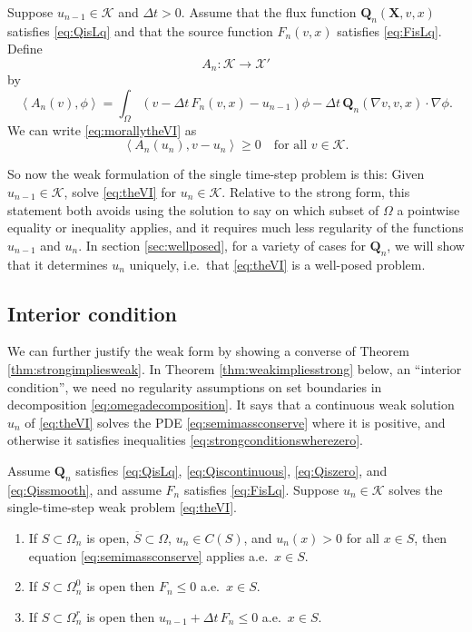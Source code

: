 \documentclass[final,leqno,onefignum,onetabnum]{siamltex1213bueler}
\newcommand\bQ{\mathbf{Q}}
\newcommand\bX{\mathbf{X}}
\renewcommand{\grad}{\nabla}
\newcommand{\ip}[2]{\ensuremath{\left<#1,#2\right>}}
\begin{document}
\medskip
\begin{definition}  Suppose $u_{n-1}\in\mathcal{K}$ and $\Delta t>0$.  Assume that the flux function $\bQ_n(\bX,v,x)$ satisfies \eqref{eq:QisLq} and that the source function $F_n(v,x)$ satisfies \eqref{eq:FisLq}.  Define
    $$A_n:\mathcal{K} \to \mathcal{X}'$$
by
\begin{equation}
  \ip{A_n(v)}{\phi} = \int_\Omega \left(v - \Delta t\, F_n(v,x) - u_{n-1}\right)\phi - \Delta t\, \bQ_n(\grad v,v,x) \cdot \grad\phi. \label{eq:defineAn}
\end{equation}
We can write \eqref{eq:morallytheVI} as
\begin{equation}
  \ip{A_n(u_n)}{v-u_n} \ge 0 \quad \text{for all $v \in \mathcal{K}$.}\label{eq:theVI}
\end{equation}
\end{definition}

So now the weak formulation of the single time-step problem is this:  Given $u_{n-1}\in\mathcal{K}$, solve \eqref{eq:theVI} for $u_n\in\mathcal{K}$.  Relative to the strong form, this statement both avoids using the solution to say on which subset of $\Omega$ a pointwise equality or inequality applies, and it requires much less regularity of the functions $u_{n-1}$ and $u_n$.  In section \ref{sec:wellposed}, for a variety of cases for $\bQ_n$, we will show that it determines $u_n$ uniquely, i.e.~that \eqref{eq:theVI} is a well-posed problem.

\subsection{Interior condition}  \label{subsec:interior}  We can further justify the weak form by showing a converse of Theorem \ref{thm:strongimpliesweak}.  In Theorem \ref{thm:weakimpliesstrong} below, an ``interior condition'', we need no regularity assumptions on set boundaries in decomposition \eqref{eq:omegadecomposition}.  It says that a continuous weak solution $u_n$ of \eqref{eq:theVI} solves the PDE \eqref{eq:semimassconserve} where it is positive, and otherwise it satisfies inequalities \eqref{eq:strongconditionswherezero}.

\medskip
\begin{theorem} \label{thm:weakimpliesstrong}  Assume $\bQ_n$ satisfies \eqref{eq:QisLq}, \eqref{eq:Qiscontinuous}, \eqref{eq:Qiszero}, and \eqref{eq:Qissmooth}, and assume $F_n$ satisfies \eqref{eq:FisLq}.  Suppose $u_n\in\mathcal{K}$ solves the single-time-step weak problem \eqref{eq:theVI}.
\renewcommand{\labelenumi}{\emph{(\roman{enumi})}}
\begin{enumerate}
\item If $S \subset \Omega_n$ is open, $\overline{S}\subset \Omega$, $u_n\in C(S)$, and $u_n(x)>0$ for all $x\in S$, then equation \eqref{eq:semimassconserve} applies a.e.~$x\in S$.
\item If $S \subset \Omega_n^0$ is open then $F_n \le 0$ a.e.~$x\in S$.
\item If $S \subset \Omega_n^r$ is open then $u_{n-1} + \Delta t\,F_n \le 0$ a.e.~$x\in S$.
\end{enumerate}
\end{theorem}
\end{document}
